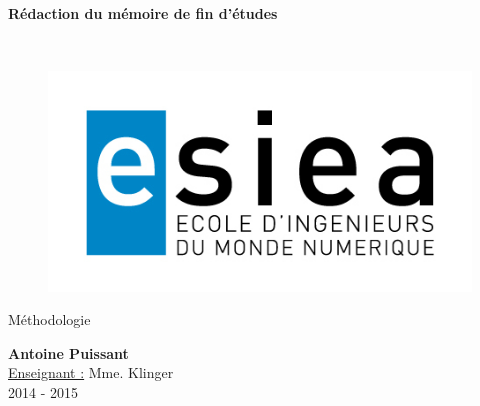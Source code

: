\begin{titlepage}
      \begin{center}   
        \Huge
        \textbf{Rédaction du mémoire de fin d'études}
        
        \LARGE
        ~
        
        
        \vfill
        \begin{figure}[H]
	    \centering
	    \begin{minipage}{0.9\textwidth}
		\centering
		\includegraphics[width=\textwidth]{./img/esiea.jpeg}
	    \end{minipage}\hfill
	\end{figure}
        \vfill
        
        \vspace{0.5cm}
        
        Méthodologie
        
        \vspace{2cm}
        \textbf{Antoine Puissant}\\
        \vspace{0.8cm}
        \Large
        \underline{Enseignant :} Mme. Klinger\\
        \vspace{0.5cm}
        2014 - 2015%
        
    \end{center}
\end{titlepage}